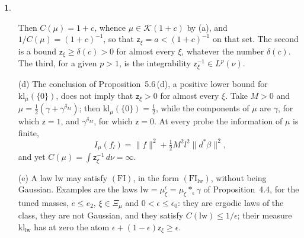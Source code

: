 \documentclass[11pt]{amsart}
\newcommand{\namedhead}{}
\theoremstyle{definition}
\newtheorem*{namedinner}{\namedhead}
\newenvironment{named}[1]{\renewcommand{\namedhead}{#1}\begin{namedinner}}{\end{namedinner}}
\begin{document}
\begin{named}{Proposition 7.2}
\begin{itemize}
Then $C(\mu)=1+c$, whence $\mu\in\mathcal K(1+c)$ by (a), and $1/C(\mu)=(1+c)^{-1}$, so that $\mathsf z_\xi=a<(1+c)^{-1}$ on that set.
The second is a bound $\mathsf z_\xi\ge\delta(c)>0$ for almost every $\xi$, whatever the number $\delta(c)$.
The third, for a given $p>1$, is the integrability $\mathsf z_\xi^{-1}\in L^p(\nu)$.
\item[(d)] The conclusion of Proposition~5.6\,(d), a positive lower bound for $\mathrm{kl}_\mu(\{0\})$, does not imply that $\mathsf z_\xi>0$ for almost every $\xi$.
Take $M>0$ and $\mu=\frac12(\gamma+\gamma^{\delta_M})$;
then $\mathrm{kl}_\mu(\{0\})=\frac12$,
while the components of $\mu$ are $\gamma$, for which $\mathsf z=1$, and $\gamma^{\delta_M}$, for which $\mathsf z=0$.
At every probe the information of $\mu$ is finite,
\begin{equation*}
I_\mu(f_l)=\|f\|^2+\tfrac12M^2l^2\|d^*\beta\|^2,
\end{equation*}
and yet $C(\mu)=\int\mathsf z_\xi^{-1}\,d\nu=\infty$.
\item[(e)] A law $\mathrm{lw}$ may satisfy $(\mathrm{FI})$, in the form $(\mathrm{FI}_{\mathrm{lw}})$, without being Gaussian.
Examples are the laws $\mathrm{lw}=\mu_\xi^\epsilon=\mu_\xi\ast_\epsilon\gamma$ of Proposition~4.4, for the tuned masses, $e\le e_2$, $\xi\in\Xi_\mu$ and $0<\epsilon\le\epsilon_0$:
they are ergodic laws of the class, they are not Gaussian, and they satisfy $C(\mathrm{lw})\le1/\epsilon$;
their measure $\mathrm{kl}_{\mathrm{lw}}$ has at zero the atom $\epsilon+(1-\epsilon)\mathsf z_\xi\ge\epsilon$.
\end{itemize}
\end{named}
\end{document}
